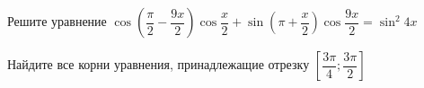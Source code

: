 \begin{ex}
	\begin{condition}
		\begin{enumcols}[label=\asbuk*)]
			\item Решите уравнение \( \cos{\left(\dfrac{\pi}{2}-  \dfrac{9x}{2}\right)}\cos{\dfrac{x}{2}} + \sin{\left(\pi+  \dfrac{x}{2}\right)}\cos{\dfrac{9x}{2}}= \sin^2 4x \)
			\item Найдите все корни уравнения, принадлежащие отрезку \( \left[\dfrac{3\pi}{4};\dfrac{3\pi}{2}\right]  \)
		\end{enumcols}
	\end{condition}
\end{ex}